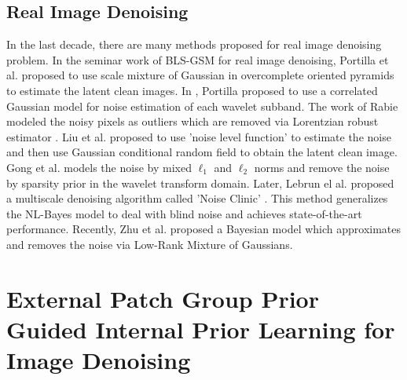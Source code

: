 \documentclass[10pt,twocolumn,letterpaper]{article}
\begin{document}
\subsection{Real Image Denoising}

In the last decade, there are many methods \cite{fullyblind,rabie2005robust,Liu2008,almapg,noiseclinic,Zhu_2016_CVPR,crosschannel2016} proposed for real image denoising problem. In the seminar work of BLS-GSM \cite{blsgsm} for real image denoising, Portilla et al. proposed to use scale mixture of Gaussian in overcomplete oriented pyramids to estimate the latent clean images. In \cite{fullyblind}, Portilla proposed to use a correlated Gaussian model for noise estimation of each wavelet subband. The work of Rabie \cite{rabie2005robust} modeled the noisy pixels as outliers which are removed via Lorentzian robust estimator \cite{huber2011robust}. Liu et al. \cite{Liu2008} proposed to use 'noise level function' to estimate the noise and then use Gaussian conditional random field to obtain the latent clean image. Gong et al. \cite{almapg} models the noise by mixed $\ell_{1}$ and $\ell_{2}$ norms and remove the noise by sparsity prior in the wavelet transform domain. Later, Lebrun el al. proposed a multiscale denoising algorithm called 'Noise Clinic' \cite{noiseclinic}. This method generalizes the NL-Bayes model \cite{nlbayes} to deal with blind noise and achieves state-of-the-art performance. Recently, Zhu et al. proposed a Bayesian model \cite{Zhu_2016_CVPR} which approximates and removes the noise via Low-Rank Mixture of Gaussians.

\section{External Patch Group Prior Guided Internal Prior Learning for Image Denoising}
\end{document}
